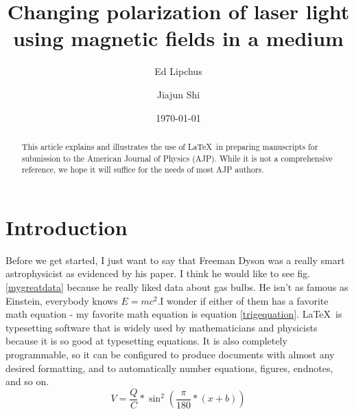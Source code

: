 \documentclass[prb,preprint]{revtex4-1}
\begin{document}

\title{Changing polarization of laser light using magnetic fields in a medium}

\author{Ed Lipchus}

\author{Jiajun Shi}


\date{\today}

\begin{abstract}
This article explains and illustrates the use of \LaTeX\ in preparing manuscripts
for submission to the American Journal of Physics (AJP). While it is not a
comprehensive reference, we hope it will suffice for the needs of most
AJP authors.
\end{abstract}

\maketitle %


\section{Introduction} %

Before we get started, I just want to say that Freeman Dyson was a really smart astrophysicist as evidenced by his paper.\cite{dyson} I think he would like to see fig.\ref{mygreatdata} because he really liked data about gas bulbs. He isn't as famous as Einstein, everybody knows $E = mc^2$.I wonder if either of them has a favorite math equation - my favorite math equation is equation \ref{trigequation}. \LaTeX\ is typesetting software that is widely used by mathematicians
and physicists because it is so good at typesetting equations. It is 
also completely programmable, so it can be configured to produce 
documents with almost any desired formatting, and to automatically
number equations, figures, endnotes, and so on.
\begin{equation}
\label{trigequation}
V = \frac{Q}{C}*\sin^{2}(\frac{\pi }{180}*(x+b))
\end{equation}
\end{document}

